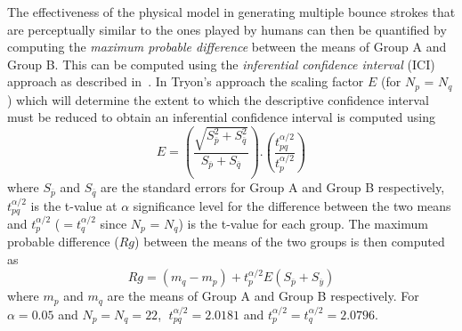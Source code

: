 \documentclass[final,1p,times]{elsarticle}
\begin{document}
The effectiveness of the physical model in generating multiple bounce strokes that are perceptually similar to the ones played by humans can then be quantified by computing the \textit{maximum probable difference} between the means of Group A and Group B. This can be computed using the \textit{inferential confidence interval} (ICI) approach as described in~\cite{tryon2001evaluating,tryon2008inferential}.
In Tryon's approach the scaling factor $E$ (for $N_p$ = $N_q$) which will determine the extent to which the descriptive confidence interval must be reduced to obtain an inferential confidence interval is computed using
\begin{equation}
E = \left(\frac{\sqrt{S_{\overline{p}}^{2} + S_{\overline{q}}^{2}}}{S_{\overline{p}} + S_{\overline{q}}}\right).\left(\frac{t_{pq}^{\alpha/2}}{t_{p}^{\alpha/2}}\right)
\end{equation}
where $S_{\overline{p}}$ and $S_{\overline{q}}$ are the standard errors for Group A and Group B respectively, $t_{pq}^{\alpha/2}$ is the t-value at $\alpha$ significance level for the difference between the two means and $t_{p}^{\alpha/2}$ ($= t_{q}^{\alpha/2}$ since $N_p$ = $N_q$) is the t-value for each group. 
The maximum probable difference ($Rg$) between the means of the two groups is then computed as 
\begin{equation}
Rg = (m_q - m_p) + t_{p}^{\alpha/2}E(S_{\overline{p}} + S_{\overline{y}}) 
\end{equation}
where $m_p$ and $m_q$ are the means of Group A and Group B respectively.
For $\alpha=0.05$ and $N_p = N_q = 22$, $\;t_{pq}^{\alpha/2} = 2.0181$ and $t_{p}^{\alpha/2} = t_{q}^{\alpha/2} = 2.0796$.


\end{document}
